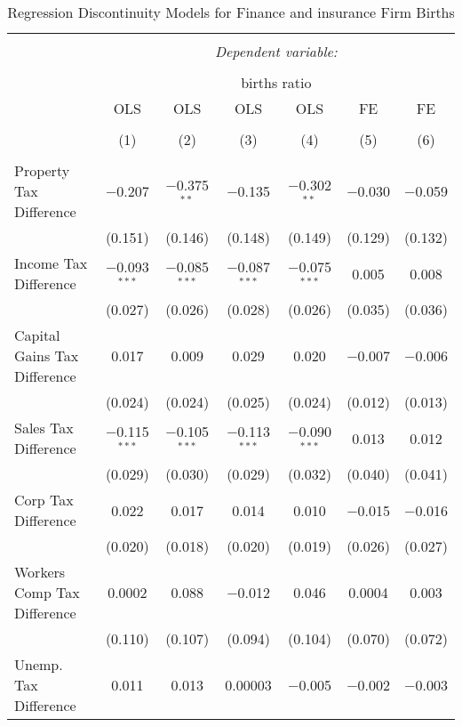 
\begin{table}[!htbp] \centering 
  \caption{Regression Discontinuity Models for  Finance and insurance Firm Births} 
  \label{52rd} 
\begin{tabular}{@{\extracolsep{5pt}}lcccccc} 
\\[-1.8ex]\hline 
\hline \\[-1.8ex] 
 & \multicolumn{6}{c}{\textit{Dependent variable:}} \\ 
\cline{2-7} 
\\[-1.8ex] & \multicolumn{6}{c}{births ratio} \\ 
 & OLS & OLS & OLS & OLS & FE & FE \\ 
\\[-1.8ex] & (1) & (2) & (3) & (4) & (5) & (6)\\ 
\hline \\[-1.8ex] 
 Property Tax Difference & $-$0.207 & $-$0.375$^{**}$ & $-$0.135 & $-$0.302$^{**}$ & $-$0.030 & $-$0.059 \\ 
  & (0.151) & (0.146) & (0.148) & (0.149) & (0.129) & (0.132) \\ 
  Income Tax Difference & $-$0.093$^{***}$ & $-$0.085$^{***}$ & $-$0.087$^{***}$ & $-$0.075$^{***}$ & 0.005 & 0.008 \\ 
  & (0.027) & (0.026) & (0.028) & (0.026) & (0.035) & (0.036) \\ 
  Capital Gains Tax Difference & 0.017 & 0.009 & 0.029 & 0.020 & $-$0.007 & $-$0.006 \\ 
  & (0.024) & (0.024) & (0.025) & (0.024) & (0.012) & (0.013) \\ 
  Sales Tax Difference & $-$0.115$^{***}$ & $-$0.105$^{***}$ & $-$0.113$^{***}$ & $-$0.090$^{***}$ & 0.013 & 0.012 \\ 
  & (0.029) & (0.030) & (0.029) & (0.032) & (0.040) & (0.041) \\ 
  Corp Tax Difference & 0.022 & 0.017 & 0.014 & 0.010 & $-$0.015 & $-$0.016 \\ 
  & (0.020) & (0.018) & (0.020) & (0.019) & (0.026) & (0.027) \\ 
  Workers Comp Tax Difference & 0.0002 & 0.088 & $-$0.012 & 0.046 & 0.0004 & 0.003 \\ 
  & (0.110) & (0.107) & (0.094) & (0.104) & (0.070) & (0.072) \\ 
  Unemp. Tax Difference & 0.011 & 0.013 & 0.00003 & $-$0.005 & $-$0.002 & $-$0.003 \\ 

\end{tabular}
\end{table}
